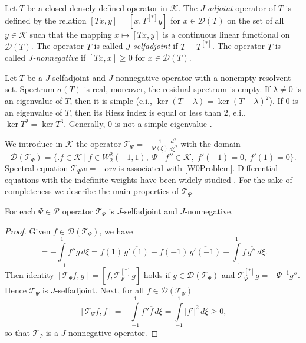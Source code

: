 \documentclass[11pt,english]{amsart}
\begin{document}
Let $T$ be a closed densely defined operator in $\mathcal{K}$.
The $J$-\textit{adjoint} operator of $T$ is defined by the
relation $[Tx,y]=[x,T^{[*]}y]$ for $x\in \mathcal{D}(T)$
on the set of all $y\in \mathcal{K}$ such that the mapping $x\mapsto [Tx, y]$ is a continuous linear functional on
$\mathcal{D}(T)$. The operator $T$ is called $J$\textit{-selfadjoint} if $T = T^{[*]}$.
The operator  $T$ is called \emph{$J$-nonnegative} if $[Tx,x]\geq0$ for  $x\in \mathcal{D}(T)$.
\begin{g_lemma}\label{LemmaJ}
Let $T$ be a $J$-selfadjoint and $J$-nonnegative operator with a nonempty resolvent set.
Spectrum $\sigma(T)$ is real, moreover, the residual spectrum is empty. If $\lambda\neq 0$ is
an eigenvalue of $T$, then it is simple (e.i., $\ker (T-\lambda)=\ker (T-\lambda)^2$).
If $0$ is an eigenvalue of $T$,  then its Riesz index is equal or less than $2$, e.i., $\ker T^2=\ker T^3$.
Generally, $0$ is not a simple eigenvalue \cite[p. 138]{IA}.
\end{g_lemma}
We introduce in $\mathcal{K}$ the operator $\mathcal{T}_\Psi=-\frac{1}{\Psi(\xi)}\frac{d^2}{d\xi^2}$ with the domain
$$
\mathcal{D}(\mathcal{T}_\Psi)=\{\bigl.f\in \mathcal{K}\:\bigr|\: f\in
W_2^2(-1,1),\; \Psi^{-1}f''\in \mathcal{K},\; f'(-1)=0,\:f'(1)=0
\}.
$$
Spectral equation $\mathcal{T}_\Psi w=-\alpha w$ is associated with \eqref{W0Problem}.
Differential equations with the indefinite weights have been widely studied  \cite{CurJDE, IohvidovKreinLanger, KarabashKostenkoMalamud, PiatkovSMZh}. For the sake of completeness we describe the main properties of $\mathcal{T}_\Psi$.
\begin{g_theorem}\label{ThJproperties}
For each  $\Psi\in \mathcal{P}$  operator $\mathcal{T}_\Psi$ is $J$-selfadjoint and $J$-non\-ne\-ga\-tive.
\end{g_theorem}
\begin{proof}
Given $f\in \mathcal{D}(\mathcal{T}_\Psi)$, we have
\begin{equation*}
[\mathcal{T}_\Psi f,g]=-\int\limits_{-1}^1f''\overline{g}\,d\xi=
f(1)\,\overline{g'(1)}-f(-1)\,\overline{g'(-1)}
-\int\limits_{-1}^1f\,\overline{{g}''}\,d\xi.
\end{equation*}
Then  identity $[\mathcal{T}_\Psi f,g]=[f,\mathcal{T}_\Psi^{[*]} g]$ holds
if $g\in \mathcal{D}(\mathcal{T}_\Psi)$ and $\mathcal{T}_\Psi^{[*]} g=-\Psi^{-1}g''$. Hence  $\mathcal{T}_\Psi$ is $J$-selfadjoint. Next, for all $f\in \mathcal{D}(\mathcal{T}_\Psi)$
$$
[\mathcal{T}_\Psi f,f]=-\int\limits_{-1}^1f'' \overline{f}\,d\xi=
\int\limits_{-1}^1{\left\vert{f'}\right\vert}^2\,d\xi\geq0,
$$
so that   $\mathcal{T}_\Psi$ is a $J$-nonnegative operator.
\end{proof}
\end{document}
